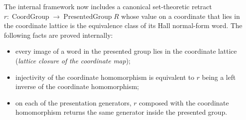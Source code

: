 The internal framework now includes a canonical set-theoretic retract $r\colon
\operatorname{CoordGroup} \to \operatorname{PresentedGroup} R$ whose value on a coordinate that
lies in the coordinate lattice is the equivalence class of its Hall normal-form word. The
following facts are proved internally:
\begin{itemize}
  \item every image of a word in the presented group lies in the coordinate lattice
    (\emph{lattice closure of the coordinate map});
  \item injectivity of the coordinate homomorphism is equivalent to $r$ being a left inverse of
    the coordinate homomorphism;
  \item on each of the presentation generators, $r$ composed with the coordinate homomorphism
    returns the same generator inside the presented group.
\end{itemize}
